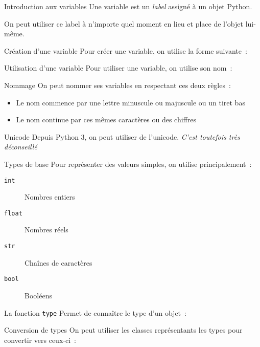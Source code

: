 \begin{frame}{Introduction aux variables}
  Une variable est un \emph{label} assigné à un objet Python.

  On peut utiliser ce label à n'importe quel moment en lieu et place de l'objet lui-même.
\end{frame}

\begin{frame}{Création d'une variable}
  Pour créer une variable, on utilise la forme suivante~:
\end{frame}

\begin{frame}{Utilisation d'une variable}
  Pour utiliser une variable, on utilise son nom~:
\end{frame}

\begin{frame}{Nommage}
  On peut nommer ses variables en respectant ces deux règles~:

  \begin{itemize}
    \item Le nom commence par une lettre minuscule ou majuscule ou un tiret bas
    \item Le nom continue par ces mêmes caractères ou des chiffres
  \end{itemize}

  \begin{alertblock}{Unicode}
    Depuis Python 3, on peut utiliser de l'unicode. \emph{C'est toutefois très déconseillé}
  \end{alertblock}
\end{frame}

\begin{frame}{Types de base}
  Pour représenter des valeurs simples, on utilise principalement~:

  \begin{description}
    \item[\texttt{int}] Nombres entiers
    \item[\texttt{float}] Nombres réels
    \item[\texttt{str}] Chaînes de caractères
    \item[\texttt{bool}] Booléens
  \end{description}
\end{frame}

\begin{frame}{La fonction \texttt{type}}
  Permet de connaître le type d'un objet~:

\end{frame}

\begin{frame}{Conversion de types}
  On peut utiliser les classes représentants les types pour convertir vers ceux-ci~:

\end{frame}
